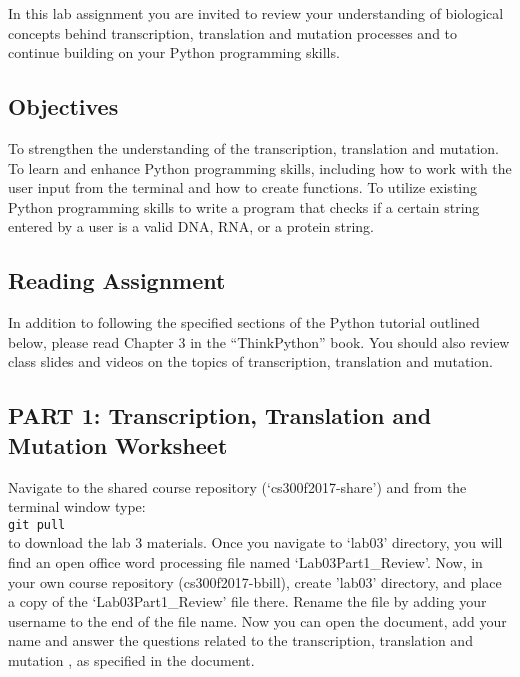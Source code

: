 

\long{}



In this lab assignment you are invited to review your understanding of  biological concepts behind transcription, translation and mutation processes and to continue building on your Python programming skills.

\subsection*{Objectives}
To strengthen the understanding of the transcription, translation and mutation. To learn and enhance Python programming skills, including how to work with the user input from the terminal and how to create functions. To utilize existing Python programming skills to write a program that checks if a certain string entered by a user is a valid DNA, RNA, or a protein string.

\vspace*{-.1in}
\subsection*{Reading Assignment}
\vspace*{-.1in}
In addition to following the specified sections of the Python tutorial outlined below, please read Chapter 3 in the ``ThinkPython'' book. You should also review class slides and videos on the topics of transcription, translation and mutation. 

\vspace*{-.1in}
\subsection*{PART 1: Transcription, Translation and Mutation Worksheet}
\vspace*{-.1in} 
Navigate to the shared course repository (`cs300f2017-share') and from the terminal window type: \\
\color{red} {\tt git pull}  \\
\color{black}
to download the lab 3 materials. Once you navigate to `lab03' directory, you will find an open office word processing file named `Lab03Part1\_Review'. Now, in your own course repository (cs300f2017-bbill), create 'lab03' directory, and place a copy of the `Lab03Part1\_Review' file there. Rename the file by adding your username to the end of the file name. Now you can open the document, add your name and answer the questions related to the transcription, translation and mutation , as specified in the document.

